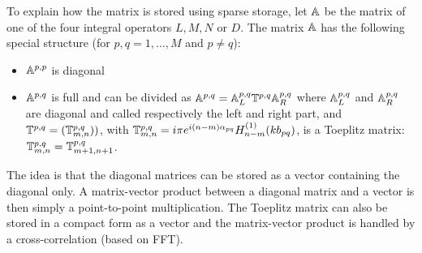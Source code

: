 To explain how the matrix is stored using \mudiff sparse storage, let ${\mathbb{A}}$ be the matrix of one of the four integral operators $L,M,N$ or $D$. The matrix ${\mathbb{A}}$ has the following special structure (for $p,q=1,\ldots,M$ and $p\neq q$):
\begin{itemize}
\item $\mathbb{A}^{p,p}$ is diagonal
\item $\mathbb{A}^{p,q}$ is full and can be divided as $\mathbb{A}^{p,q} = {\mathbb{A}}_L^{p,q}\mathbb{T}^{p,q}{\mathbb{A}}_R^{p,q}$ where ${\mathbb{A}}_L^{p,q}$ and ${\mathbb{A}}_R^{p,q}$ are diagonal and called respectively the left and right part, and $\mathbb{T}^{p,q} = (\mathbb{T}^{p,q}_{m,n}))$, with $\mathbb{T}^{p,q}_{m,n} = i\pi e^{i(n-m)\alpha_{pq}}H_{n-m}^{(1)}(kb_{pq})$, is a Toeplitz matrix: $\mathbb{T}^{p,q}_{m,n} = \mathbb{T}^{p,q}_{m+1,n+1}$.
\end{itemize}

The idea is that the diagonal matrices can be stored as a vector containing the diagonal only. A matrix-vector product between a diagonal matrix and a vector is then simply a point-to-point multiplication. The Toeplitz matrix can also be stored in a compact form as a vector and the matrix-vector product is handled by a cross-correlation (based on FFT). 

